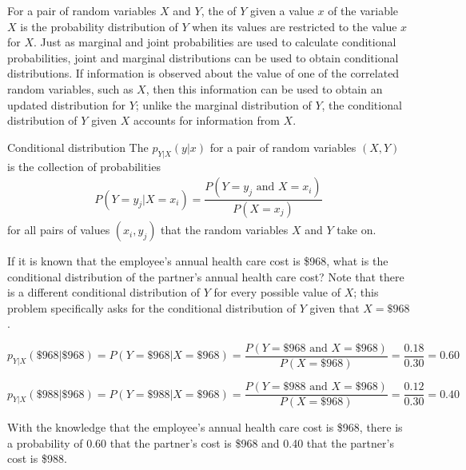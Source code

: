 For a pair of random variables $X$ and $Y$, the  of $Y$ given a value $x$ of the variable $X$ is the probability distribution of $Y$ when its values are restricted to the value $x$ for $X$. Just as marginal and joint probabilities are used to calculate conditional probabilities, joint and marginal distributions can be used to obtain conditional distributions. If information is observed about the value of one of the correlated random variables, such as $X$, then this information can be used to obtain an updated distribution for $Y$; unlike the marginal distribution of $Y$, the conditional distribution of $Y$ given $X$ accounts for information from $X$.

\textD{\newpage}

\begin{onebox}{Conditional distribution}
The  $p_{Y|X}(y|x)$ for a pair of random variables $(X, Y)$ is the collection of probabilities
\begin{align*}
P(Y = y_j| X = x_i) = \dfrac{P(Y = y_j \text{ and } X = x_i)}{P(X = x_j)}
\end{align*}
for all pairs of values $(x_i,y_j)$ that the random variables $X$ and $Y$ take on.
\end{onebox}

\begin{examplewrap}
\begin{nexample}{If it is known that the employee's annual health care cost is \$968, what is the conditional distribution of the partner's annual health care cost?}\label{conditionalHealthCareDistribution}%
Note that there is a different conditional distribution of $Y$ for every possible value of $X$; this problem specifically asks for the conditional distribution of $Y$ given that $X = \$968$.
	
	\[p_{Y|X}(\$968|\$968) = P(Y = \$968 | X = \$968) = \dfrac{P(Y = \$968 \textrm{ and } X = \$968)}{P(X = \$968)} = \dfrac{0.18}{0.30} = 0.60\]
	
	\[p_{Y|X}(\$988|\$968) = P(Y = \$988 | X = \$968) = \dfrac{P(Y = \$988 \textrm{ and } X = \$968)}{P(X = \$968)} = \dfrac{0.12}{0.30} = 0.40\]
	
  With the knowledge that the employee's annual health care cost is \$968, there is a probability of 0.60 that the partner's cost is \$968 and 0.40 that the partner's cost is \$988.
\end{nexample}
\end{examplewrap}

